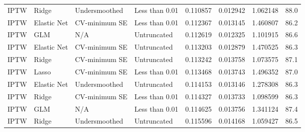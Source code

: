 \begin{longtable}[l]{llllllll}
IPTW & Ridge & Undersmoothed & Less than 0.01 & 0.110857 & 0.012942 & 1.062148 & 88.0\\
IPTW & Elastic Net & CV-minimum SE & Less than 0.01 & 0.112367 & 0.013145 & 1.460807 & 86.2\\
IPTW & GLM & N/A & Untruncated & 0.112619 & 0.012325 & 1.101915 & 86.6\\
IPTW & Elastic Net & CV-minimum SE & Untruncated & 0.113203 & 0.012879 & 1.470525 & 86.3\\
IPTW & Ridge & CV-minimum SE & Untruncated & 0.113242 & 0.013758 & 1.073575 & 87.1\\
IPTW & Lasso & CV-minimum SE & Less than 0.01 & 0.113468 & 0.013743 & 1.496352 & 87.0\\
IPTW & Elastic Net & Undersmoothed & Untruncated & 0.114153 & 0.013146 & 1.278308 & 86.3\\
IPTW & Ridge & CV-minimum SE & Less than 0.01 & 0.114327 & 0.013733 & 1.098599 & 86.3\\
IPTW & GLM & N/A & Less than 0.01 & 0.114625 & 0.013756 & 1.341124 & 87.4\\
IPTW & Ridge & Undersmoothed & Untruncated & 0.115596 & 0.014168 & 1.059427 & 86.5\\
\bottomrule
\end{longtable}
